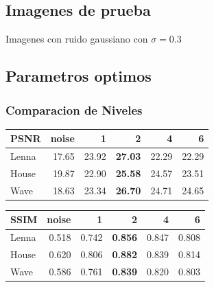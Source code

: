\documentclass{beamer}
\begin{document}
  \subsection{Imagenes de prueba}

  \begin{frame}
  
    Imagenes con ruido gaussiano con $\sigma=0.3$
  \end{frame}

  \subsection{Parametros optimos}

  \begin{frame}
    \frametitle{ Comparacion de Niveles }
    \centering
    \begin{tabular}{lrrrrr}
      \toprule
      {PSNR} &  noise &      1 &      2 &      4 &      6 \\
      \midrule
      Lenna &  17.65 &  23.92 &  \bf{27.03} &  22.29 &  22.29 \\
      House &  19.87 &  22.90 &  \bf{25.58} &  24.57 &  23.51 \\
      Wave &  18.63 &  23.34 &  \bf{26.70} &  24.71 &  24.65 \\
      \bottomrule
      \end{tabular}
  
      \begin{tabular}{lrrrrr}
        {SSIM} &  noise &      1 &      2 &      4 &      6 \\
        \midrule
        Lenna &  0.518 &  0.742 &  \bf{0.856} &  0.847 &  0.808 \\
        House &  0.620 &  0.806 &  \bf{0.882} &  0.839 &  0.814 \\
        Wave &  0.586 &  0.761 &  \bf{0.839} &  0.820 &  0.803 \\
        \bottomrule
        \end{tabular}

  \end{frame}
\end{document}
